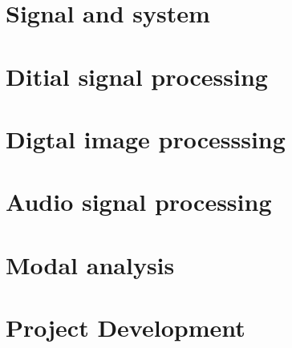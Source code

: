\documentclass[UTF8]{book}
\begin{document}
	
	\part{Signal and system}
	
	\part{Ditial signal processing}
	\begin{comment} 
	rather stupid, but helpful 
	\chapter{FFT}
	\chapter{FIR}
	\chapter{IIR}
	\end{comment}

	
	\part{Digtal image processsing}
	
	\part{Audio signal processing}
	
	\part{Modal analysis}	
	
	\part{Project Development}
	
	\begin{comment} 
	rather stupid, but helpful 
	\chapter{8-channel data acquistion system design}
	\chapter{32-channel data acquistion system design}
	\chapter{64-channel data acquistion system design}
	\end{comment}
\end{document}
